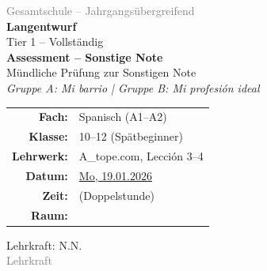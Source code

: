 \documentclass[11pt,a4paper]{article}
\newcommand{\fach}{Spanisch}
\newcommand{\jahrgangsstufe}{10--12 (Spätbeginner)}
\newcommand{\schulart}{Gesamtschule -- Jahrgangsübergreifend}
\newcommand{\stundenthema}{Assessment -- Sonstige Note}
\newcommand{\lehrkraft}{N.N.}
\newcommand{\ausbildungsstand}{Lehrkraft}
\newcommand{\gerniveau}{A1--A2}
\newcommand{\lehrwerk}{A\_tope.com}
\newcommand{\lehrwerkseite}{Lección 3--4}
\begin{document}
\begin{titlepage}
    \centering
    \vspace*{2cm}

    {\large\textcolor{gray}{\schulart}}\\[2cm]

    {\Huge\textcolor{fach}{\textbf{Langentwurf}}}\\[0.5cm]
    {\large Tier 1 -- Vollständig}\\[2cm]

    {\LARGE\textbf{\stundenthema}}\\[0.5cm]
    {\large Mündliche Prüfung zur Sonstigen Note}\\[0.3cm]
    {\Large\textit{Gruppe A: Mi barrio | Gruppe B: Mi profesión ideal}}\\[2cm]

    \begin{tabular}{rl}
        \textbf{Fach:} & \fach{} (\gerniveau) \\[0.3cm]
        \textbf{Klasse:} & \jahrgangsstufe{} \\[0.3cm]
        \textbf{Lehrwerk:} & \lehrwerk, \lehrwerkseite \\[0.3cm]
        \textbf{Datum:} & \underline{\hspace{1cm}Mo, 19.01.2026\hspace{1cm}} \\[0.3cm]
        \textbf{Zeit:} & \underline{\hspace{3cm}} (Doppelstunde) \\[0.3cm]
        \textbf{Raum:} & \underline{\hspace{3cm}} \\[0.3cm]
    \end{tabular}

    \vfill

    {\large Lehrkraft: \lehrkraft}\\[0.3cm]
    {\normalsize\textcolor{gray}{\ausbildungsstand}}\\[1cm]

\end{titlepage}

\tableofcontents
\newpage
\end{document}
